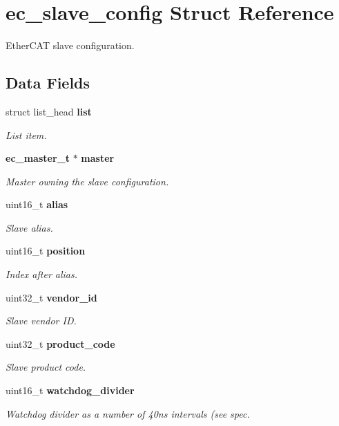 \section{ec\-\_\-slave\-\_\-config \-Struct \-Reference}
\label{structec__slave__config}


\-Ether\-C\-A\-T slave configuration.  


\subsection*{\-Data \-Fields}
\begin{DoxyCompactItemize}
\item 
struct list\-\_\-head {\bf list}
\begin{DoxyCompactList}\small\item\em \-List item. \end{DoxyCompactList}\item 
{\bf ec\-\_\-master\-\_\-t} $\ast$ {\bf master}
\begin{DoxyCompactList}\small\item\em \-Master owning the slave configuration. \end{DoxyCompactList}\item 
uint16\-\_\-t {\bf alias}
\begin{DoxyCompactList}\small\item\em \-Slave alias. \end{DoxyCompactList}\item 
uint16\-\_\-t {\bf position}
\begin{DoxyCompactList}\small\item\em \-Index after alias. \end{DoxyCompactList}\item 
uint32\-\_\-t {\bf vendor\-\_\-id}
\begin{DoxyCompactList}\small\item\em \-Slave vendor \-I\-D. \end{DoxyCompactList}\item 
uint32\-\_\-t {\bf product\-\_\-code}
\begin{DoxyCompactList}\small\item\em \-Slave product code. \end{DoxyCompactList}\item 
uint16\-\_\-t {\bf watchdog\-\_\-divider}
\begin{DoxyCompactList}\small\item\em \-Watchdog divider as a number of 40ns intervals (see spec. \end{DoxyCompactList}\item 

\end{DoxyCompactItemize}
